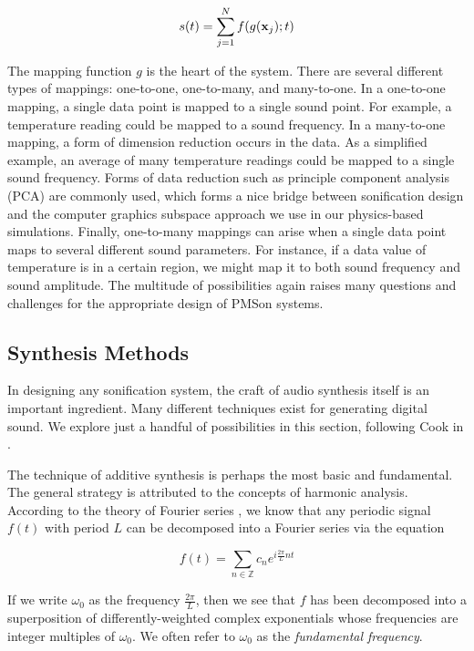 \begin{equation}
s(t) = \sum_{j=1}^N f(g(\mathbf{x}_j); t)
\end{equation}

The mapping function $g$ is the heart of the system. There are several 
different types of mappings: one-to-one, one-to-many, and many-to-one. In a 
one-to-one mapping, a single data point is mapped to a single sound point. 
For example, a temperature reading could be mapped to a sound frequency. In a 
many-to-one mapping, a form of dimension reduction occurs in the data. As a 
simplified example, an average of many temperature readings could be mapped 
to a single sound frequency. Forms of data reduction such as principle 
component analysis (PCA) are commonly used, which forms a nice bridge between 
sonification design and the computer graphics subspace approach we use in our 
physics-based simulations. Finally, one-to-many mappings can arise when a 
single data point maps to several different sound parameters. For instance, 
if a data value of temperature is in a certain region, we might map it to 
both sound frequency and sound amplitude. The multitude of possibilities 
again raises many questions and challenges for the appropriate design of 
PMSon systems.

\subsection{Synthesis Methods}
\label{sec:synthesis-metthods}
In designing any sonification system, the craft of audio synthesis itself is 
an important ingredient. Many different techniques exist for generating 
digital sound. We explore just a handful of possibilities in this section, following Cook in \cite{hermann2011sonification}.

The technique of additive synthesis is perhaps the most basic and 
fundamental. The general strategy is attributed to the concepts of harmonic 
analysis. According to the theory of Fourier series \cite{katznelson2004introduction}, we know that any 
periodic signal $f(t)$ with period $L$ can be decomposed into a Fourier 
series via the equation

\begin{equation}
f(t) = \sum_{n \in \mathbb{Z}} c_n e^{i\frac{2\pi}{L}nt}
\end{equation}

If we write $\omega_0$ as the frequency $\frac{2\pi}{L}$, then we see that $f$
 has been decomposed into a superposition of differently-weighted complex 
exponentials whose frequencies are integer multiples of $\omega_0$. We often 
refer to $\omega_0$ as the {\em fundamental frequency}. 

